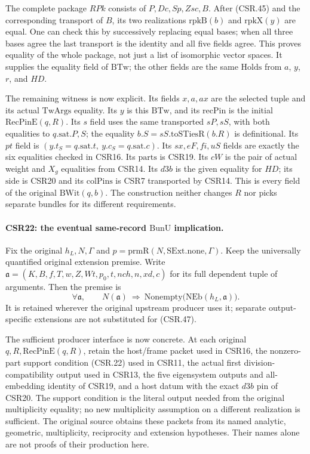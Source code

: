 The complete package \(RPk\) consists of
\(P,Dc,Sp,Zsc,B\). After (CSR.45) and the corresponding
transport of \(B\), its two realizations \(\mathrm{rpkB}(b)\)
and \(\mathrm{rpkX}(y)\) are equal. One can check this by
successively replacing equal bases; when all three
bases agree the last transport is the identity and
all five fields agree. This proves equality of the
whole package, not just a list of isomorphic vector
spaces. It supplies the equality field of
\(\mathrm{BTw}\); the other fields are the same
\(\mathrm{Holds}\) from \(a\), \(y\), \(r\), and \(HD\).

The remaining witness is now explicit. Its fields
\(x,a,ax\) are the selected tuple and its actual
\(\mathrm{TwArgs}\) equality. Its \(y\) is this
\(\mathrm{BTw}\), and its \(\mathrm{recPin}\) is the
initial \(\mathrm{RecPinE}(q,R)\).
Its \(s\) field uses the same transported \(sP,sS\),
with both equalities to \(q.\mathrm{sat}.P,S\);
the equality \(b.S=sS.\mathrm{toSTiesR}(b.R)\)
is definitional. Its \(pt\) field is
\((y.t_S=q.\mathrm{sat}.t,\ y.c_S=q.\mathrm{sat}.c)\).
Its \(sx,eF,fi,uS\) fields are exactly the six
equalities checked in CSR16. Its \(\mathrm{parts}\)
is CSR19. Its \(cW\) is the pair of actual
weight and \(X_g\) equalities from CSR14.
Its \(d3b\) is the given equality for \(HD\);
its \(\mathrm{side}\) is CSR20 and its
\(\mathrm{colPins}\) is CSR7 transported by CSR14.
This is every field of the original \(\mathrm{BWit}(q,b)\).
The construction neither changes \(R\) nor picks
separate bundles for its different requirements.

\paragraph{CSR22: the eventual same-record \(\mathrm{BunU}\) implication.}
\label{claim:CSR22}
Fix the original \(h_L,N,\Gamma\) and
\(p=\mathrm{prmR}(N,\mathrm{SExt.none},\Gamma)\).
Keep the universally quantified original extension
premise. Write
\(\mathfrak a=(K,B,f,T,w,Z,Wt,p_0,t,nch,n,xd,c)\)
for its full dependent tuple of arguments. Then the premise is
\[
 \forall\mathfrak a,\qquad
 N(\mathfrak a)\ \Longrightarrow\
 \mathrm{Nonempty}\bigl(\mathrm{NEb}(h_L,\mathfrak a)\bigr).
 \tag{CSR.47}
\]
It is retained wherever the original upstream producer
uses it; separate output-specific extensions are not
substituted for (CSR.47).

The sufficient producer interface is now concrete.
At each original \(q,R,\mathrm{RecPinE}(q,R)\), retain
the host/frame packet used in CSR16, the nonzero-part
support condition (CSR.22) used in CSR11, the actual
first division-compatibility output used in CSR13,
the five eigensystem outputs and all-embedding identity
of CSR19, and a host datum with the exact \(d3b\) pin
of CSR20. The support condition is the literal output
needed from the original multiplicity equality; no
new multiplicity assumption on a different realization
is sufficient. The original source obtains these
packets from its named analytic, geometric, multiplicity,
reciprocity and extension hypotheses. Their names alone
are not proofs of their production here.

